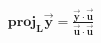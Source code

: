 \documentclass[preview]{standalone}
\begin{document}
\begin{align*}
\textbf{proj}_{\mathbf{L}}\mathbf{\vec{y}} = \frac{\mathbf{\vec{y}} \cdot \mathbf{\vec{u}}}{\mathbf{\vec{u}} \cdot \mathbf{\vec{u}}}
\end{align*}
\end{document}
